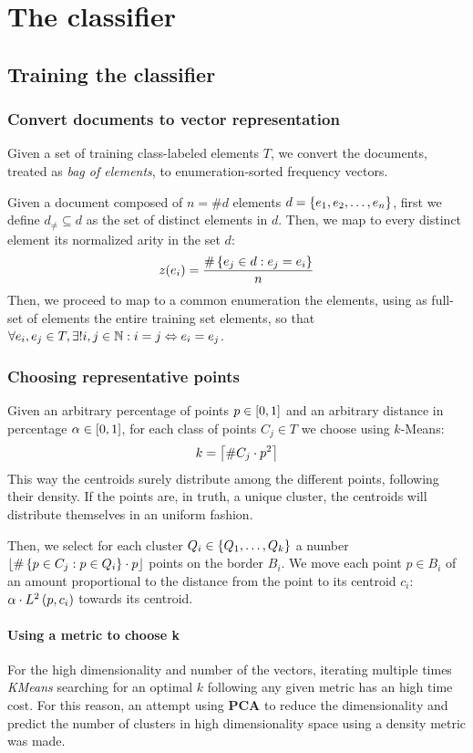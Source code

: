 \documentclass[\main/main.tex]{subfiles}
\begin{document}
\chapter{The classifier}

\section{Training the classifier}

\subsection{Convert documents to vector representation}
Given a set of training class-labeled elements \(T\), we convert the documents, treated as \textit{bag of elements}, to enumeration-sorted frequency vectors.

Given a document composed of \(n=\#d\) elements \(d = \left\{e_1, e_2, \ldots, e_n\right\}\), first we define \(d_\neq \subseteq d\) as the set of distinct elements in \(d\). Then, we map to every distinct element its normalized arity in the set \(d\):
\[
	z(e_i) = \frac{\#\left\{e_j \in d: e_j=e_i\right\}}{n}
\]
Then, we proceed to map to a common enumeration the elements, using as full-set of elements the entire training set elements, so that \(\forall e_i, e_j \in T, \exists! i, j \in \mathbb{N}: i=j \Leftrightarrow e_i=e_j \).

\subsection{Choosing representative points}
Given an arbitrary percentage of points \(p \in \left[0,1\right]\) and an arbitrary distance in percentage \(\alpha \in \left[0,1\right]\), for each class of points \(C_j \in T\) we choose using \(k\)-Means:
\[
	k=\left\lceil\#C_j\cdot p^2\right\rceil
\]
This way the centroids surely distribute among the different points, following their density. If the points are, in truth, a unique cluster, the centroids will distribute themselves in an uniform fashion.

Then, we select for each cluster \(Q_i \in \left\{Q_1, \ldots, Q_k\right\}\) a number \(\left\lfloor\#\left\{p \in C_j: p \in Q_i\right\}\cdot p\right\rfloor\) points on the border \(B_i\). We move each point \(p \in B_i\) of an amount proportional to the distance from the point to its centroid \(c_i\):\(\alpha \cdot L^2\left(p, c_i\right)\) towards its centroid.

\subsubsection{Using a metric to choose k}
For the high dimensionality and number of the vectors, iterating multiple times \textit{KMeans} searching for an optimal \(k\) following any given metric has an high time cost. For this reason, an attempt using \textbf{PCA} to reduce the dimensionality and predict the number of clusters in high dimensionality space using a density metric was made.
\end{document}
